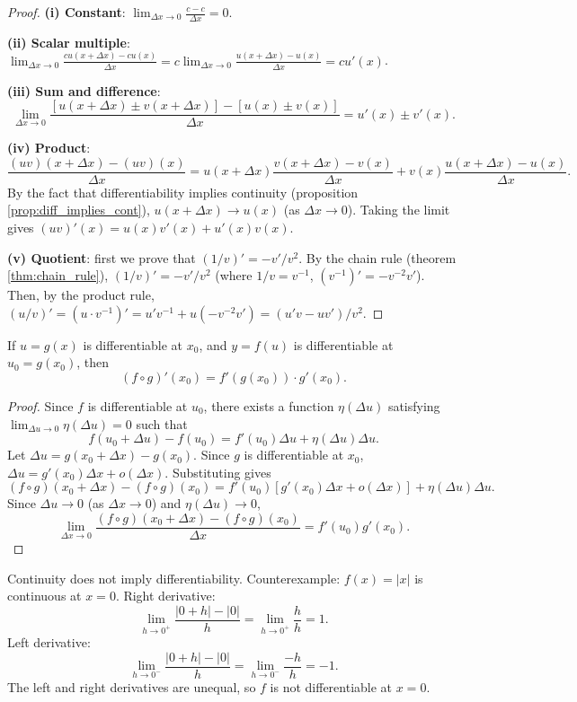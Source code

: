 \begin{proof}
\textbf{(i) Constant}: $\lim_{\Delta x \to 0} \frac{c - c}{\Delta x} = 0$.

\textbf{(ii) Scalar multiple}: $\lim_{\Delta x \to 0} \frac{cu(x+\Delta x) - cu(x)}{\Delta x} = c \lim_{\Delta x \to 0} \frac{u(x+\Delta x) - u(x)}{\Delta x} = cu'(x)$.

\textbf{(iii) Sum and difference}:
\[
\lim_{\Delta x \to 0} \frac{[u(x+\Delta x) \pm v(x+\Delta x)] - [u(x) \pm v(x)]}{\Delta x} = u'(x) \pm v'(x).
\]

\textbf{(iv) Product}:
\[
\frac{(uv)(x+\Delta x) - (uv)(x)}{\Delta x} = u(x+\Delta x)\frac{v(x+\Delta x)-v(x)}{\Delta x} + v(x)\frac{u(x+\Delta x)-u(x)}{\Delta x}.
\]
By the fact that differentiability implies continuity (proposition \ref{prop:diff_implies_cont}), $u(x+\Delta x) \to u(x)$ (as $\Delta x \to 0$). Taking the limit gives $(uv)'(x) = u(x)v'(x) + u'(x)v(x)$.

\textbf{(v) Quotient}: first we prove that $(1/v)' = -v'/v^2$. By the chain rule (theorem \ref{thm:chain_rule}), $(1/v)' = -v'/v^2$ (where $1/v = v^{-1}$, $(v^{-1})' = -v^{-2}v'$). Then, by the product rule, $(u/v)' = (u \cdot v^{-1})' = u'v^{-1} + u(-v^{-2}v') = (u'v - uv')/v^2$.
\end{proof}

\begin{theorem}\label{thm:chain_rule}
If $u = g(x)$ is differentiable at $x_0$, and $y = f(u)$ is differentiable at $u_0 = g(x_0)$, then
\[(f \circ g)'(x_0) = f'(g(x_0)) \cdot g'(x_0).\]
\end{theorem}

\begin{proof}
Since $f$ is differentiable at $u_0$, there exists a function $\eta(\Delta u)$ satisfying $\lim_{\Delta u \to 0} \eta(\Delta u) = 0$ such that
\[
f(u_0 + \Delta u) - f(u_0) = f'(u_0)\Delta u + \eta(\Delta u)\Delta u.
\]
Let $\Delta u = g(x_0 + \Delta x) - g(x_0)$. Since $g$ is differentiable at $x_0$, $\Delta u = g'(x_0)\Delta x + o(\Delta x)$. Substituting gives
\[
(f \circ g)(x_0 + \Delta x) - (f \circ g)(x_0) = f'(u_0)[g'(x_0)\Delta x + o(\Delta x)] + \eta(\Delta u)\Delta u.
\]
Since $\Delta u \to 0$ (as $\Delta x \to 0$) and $\eta(\Delta u) \to 0$,
\[
\lim_{\Delta x \to 0} \frac{(f \circ g)(x_0 + \Delta x) - (f \circ g)(x_0)}{\Delta x} = f'(u_0)g'(x_0).
\]
\end{proof}

\begin{remark}\label{rem:continuous_not_differentiable}
Continuity does not imply differentiability. Counterexample: $f(x)=|x|$ is continuous at $x=0$. Right derivative:
\[
\lim_{h \to 0^+} \frac{|0+h| - |0|}{h} = \lim_{h \to 0^+} \frac{h}{h} = 1.
\]
Left derivative:
\[
\lim_{h \to 0^-} \frac{|0+h| - |0|}{h} = \lim_{h \to 0^-} \frac{-h}{h} = -1.
\]
The left and right derivatives are unequal, so $f$ is not differentiable at $x=0$.
\end{remark}

